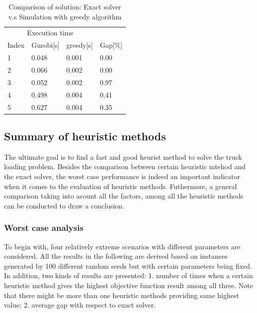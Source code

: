 \documentclass{article}
\begin{document}
\begin{table}[ht]
 \caption{Comparison of solution: Exact solver v.s Simulation with greedy algorithm}
  \centering
  \begin{tabular}{llll}
    \toprule
    \multicolumn{3}{c}{Execution time}                   \\
    \cmidrule(r){2-3}
    Index   & Gurobi[s]     & greedy[s]      & Gap[\%] \\
    \midrule
    1	&	0.048 	&	0.001 	&	0.00 	\\
    2	&	0.066 	&	0.002 	&	0.00 	\\
    3	&	0.052 	&	0.002 	&	0.97 	\\
    4	&	0.498 	&	0.004 	&	0.41 	\\
    5	&	0.627 	&	0.004 	&	0.35 	\\
    \bottomrule
  \end{tabular}
  \label{tab:exact_greedy}
\end{table}

\subsection{Summary of heuristic methods}
The ultimate goal is to find a fast and good heurist method to solve the truck loading problem. Besides the comparison between certain heuristic mtehod and the exact solver, the worst case performance is indeed an important indicator when it comes to the evaluation of heuristic methods. Futhermore, a general comparison taking into acount all the factors, among all the heuristic methods can be conducted to draw a conclusion.

\subsubsection{Worst case analysis}
To begin with, four relatively extreme scenarios with different parameters are considered. All the results in the following are derived based on instances generated by 100 different random seeds but with certain parameters being fixed. In addition, two kinds of results are presented: 1. number of times when a certain heuristic method gives the highest objective function result among all three. Note that there might be more than one heuristic methods providing same highest value; 2. average gap with respect to exact solver.
\end{document}
